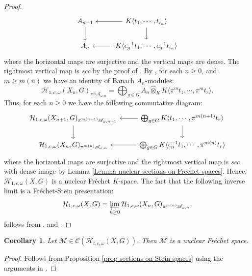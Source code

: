 \documentclass{amsart}
\newtheorem{coro}[defi]{Corollary}
\begin{document}
\begin{proof}
\begin{equation*}
\begin{tikzcd}
A_{n+1} \arrow[d] & {K\langle t_1,\cdots, t_{i_n}\rangle} \arrow[l] \arrow[d] \\
A_n               & {K\langle \epsilon_n^{-1}t_1,\cdots, \epsilon_n^{-1}t_{i_n}\rangle} \arrow[l]                            
\end{tikzcd}
\end{equation*}
where the horizontal maps are surjective and the vertical maps are dense. The rightmost vertical map is \emph{scc} by the proof of \cite[Lemma 3.1.3]{HochschildDmodules2}. By \cite[Corollary 4.3.3]{p-adicCheralg}, for each $n\geq 0$, and $m\geq m(n)$ we have an identity of Banach $A_n$-modules:
\begin{equation*}
    \mathcal{H}_{1,c,\omega}(X_n,G)_{\pi^{m}\mathscr{A}_{\omega,n}}=\bigoplus_{g\in G}A_{n}\widehat{\otimes}_K K\langle \pi^mt_1,\cdots, \pi^m t_r\rangle.
\end{equation*}
Thus, for each $n\geq 0$ we have the following commutative diagram:
\begin{equation*}
\begin{tikzcd}
{\mathcal{H}_{1,c,\omega}(X_{n+1},G)_{\pi^{m(n+1)}\mathscr{A}_{\omega,n+1}}} \arrow[d] & {\bigoplus_{g\in G}K\langle t_1,\cdots, \pi^{m(n+1)}t_r\rangle}\arrow[l] \arrow[d] \\
{\mathcal{H}_{1,c,\omega}(X_n,G)_{\pi^{m(n)}\mathscr{A}_{\omega,n}}}                   & \bigoplus_{g\in G}K\langle \epsilon_n^{-1}t_1,\cdots,  \pi^{m(n)}t_r\rangle \arrow[l]                                                                                          
\end{tikzcd}
\end{equation*}
where the horizontal maps are surjective and the rightmost vertical map is \emph{scc} with dense image by Lemma \ref{Lemma nuclear sections on Frechet spaces}. Hence, $\mathcal{H}_{1,c,\omega}(X,G)$ is a nuclear Fréchet $K$-space.
The fact that the following inverse limit is a Fréchet-Stein presentation:
\begin{equation*}
  \mathcal{H}_{1,c,\omega}(X,G)=\varprojlim_{n\geq 0}\mathcal{H}_{1,c,\omega}(X_n,G)_{\pi^{m(n)}\mathscr{A}_{\omega,n}},  
\end{equation*}
 follows from \cite[Theorem 4.3.15]{p-adicCheralg}, and \cite[Corollary 4.5.5]{p-adicCheralg}.
\end{proof}
\begin{coro}
Let $\mathcal{M}\in \mathcal{C}(\mathcal{H}_{t,c,\omega}(X,G))$. Then $\mathcal{M}$ is a nuclear Fréchet space.
\end{coro}
\begin{proof}
Follows from Proposition \ref{prop sections on Stein spaces} using the arguments in \cite[Proposition 5.5]{bode2021operations}.
\end{proof}
\end{document}
